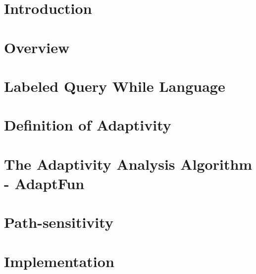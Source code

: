 \documentclass[acmsmall]{acmart}
\newcommand{\THESYSTEM}{\textsf{AdaptFun}}
\begin{document}

\maketitle

\section{Introduction}
\label{sec:intro}

\section{Overview}
\label{sec:overview}

\section{Labeled Query  While  Language}
\label{sec:loop_language}
{}
\section{Definition of Adaptivity}
\label{sec:adaptivity}

\section{The Adaptivity Analysis Algorithm - {\THESYSTEM}}
\label{sec:algorithm}
{}
\section{Path-sensitivity}
\label{sec:examples}

\section{Implementation}
\label{sec:implementation}

\end{document}
